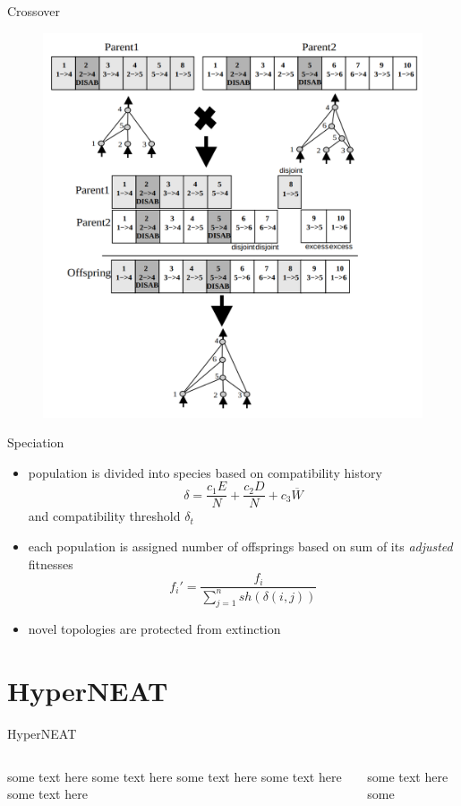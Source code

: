\documentclass{beamer}
\begin{document}
\begin{frame}{Crossover}
    \begin{figure}[c]
        \includegraphics[scale=0.2]{img/crossover.png}
    \end{figure}    
\end{frame}
\begin{frame}{Speciation}
    \begin{itemize}
        \item population is divided into species based on compatibility history \begin{equation*}
            \delta = \frac{c_1E}{N}+\frac{c_2D}{N}+c_3 \overline{W}
        \end{equation*} and compatibility threshold $\delta_t$
        \item each population is assigned number of offsprings based on sum of its \emph{adjusted} fitnesses
        \begin{equation*}
            f_i' =\frac{f_i}{\sum_{j=1}^n sh(\delta(i,j))}
        \end{equation*}
        \item novel topologies are protected from extinction
    \end{itemize}    
\end{frame}
\section{HyperNEAT}
\begin{frame}{HyperNEAT}
    \begin{columns}
        \begin{column}{0.5\textwidth}
            some text here some text here some text here some text here some text here
        \end{column}
        \begin{column}{0.5\textwidth}
            some text here some
        \end{column}
    \end{columns}
\end{frame}
\end{document}
